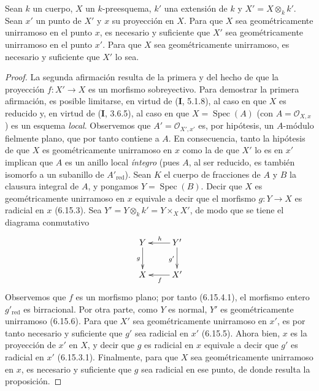 \begin{proposition}[6.15.7]
Sean $k$ un cuerpo, $X$ un $k$-preesquema, $k'$ una extensión
de $k$ y $X'=X\otimes_k k'$. Sean $x'$ un punto de $X'$ y $x$
su proyección en $X$. Para que $X$ sea geométricamente
unirramoso en el punto $x$, es necesario y suficiente que
$X'$ sea geométricamente unirramoso en el punto $x'$. Para
que $X$ sea geométricamente unirramoso, es necesario y
suficiente que $X'$ lo sea.
\end{proposition}

\begin{proof}
La segunda afirmación resulta de la primera y del hecho de
que la proyección $f:X'\to X$ es un morfismo sobreyectivo.
Para demostrar la primera afirmación, es posible limitarse, en
virtud de (\textbf I, 5.1.8), al caso en que $X$ es reducido y, en
virtud de (\textbf I, 3.6.5), al caso
en que $X=\operatorname{Spec}(A)$ (con $A=\mathcal O_{X,x}$) es un
esquema \emph{local}. Observemos que $A'=\mathcal O_{X',x'}$ es, por
hipótesis, un $A$-módulo fielmente plano, que por tanto
contiene a $A$. En consecuencia, tanto la hipótesis de que
$X$ es geométricamente unirramoso en $x$ como la de que $X'$
lo es en $x'$ implican que $A$ es un anillo local \emph{íntegro}
(pues $A$, al ser reducido, es también isomorfo a un
subanillo de $A'_{\mathrm{red}}$). Sean $K$ el cuerpo de
fracciones de $A$ y $B$ la clausura integral de $A$, y
pongamos $Y=\operatorname{Spec}(B)$. Decir que $X$ es
geométricamente unirramoso en $x$ equivale a decir que el
morfismo $g:Y\to X$ es radicial en $x$ (6.15.3). Sea
$Y'=Y\otimes_k k'=Y\times_X X'$, de modo que se tiene el
diagrama conmutativo
\[
\xymatrix{
Y \ar[d]_g & Y' \ar[l]_h \ar[d]_{g'}\\
X & X' \ar[l]^f
}
\]
Observemos que $f$ es un morfismo plano; por tanto (6.15.4.1),
el morfismo entero $g'_{\mathrm{red}}$ es birracional. Por
otra parte, como $Y$ es normal, $Y'$ es geométricamente
unirramoso (6.15.6). Para que $X'$ sea geométricamente
unirramoso en $x'$, es por tanto necesario y suficiente que
$g'$ sea radicial en $x'$ (6.15.5). Ahora bien, $x$ es la
proyección de $x'$ en $X$, y decir que $g$ es radicial en $x$
equivale a decir que $g'$ es radicial en $x'$ (6.15.3.1).
Finalmente, para que $X$ sea geométricamente unirramoso en
$x$, es necesario y suficiente que $g$ sea radicial en ese
punto, de donde resulta la proposición.
\end{proof}
